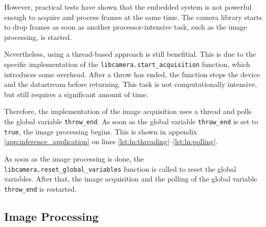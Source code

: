 However, practical tests have shown that the embedded system is not powerful enough to acquire and process frames at the same time.
The camera library starts to drop frames as soon as another processor-intensive task, such as the image processing, is started.

Nevertheless, using a thread-based approach is still benefitial.
This is due to the specific implementation of the \texttt{libcamera.start\_acquisition} function, which introduces some overhead.
After a throw has ended, the function stops the device and the datastream before returning.
This task is not computationally intensive, but still requires a significant amount of time.

Therefore, the implementation of the image acquisition uses a thread and polls the global variable \texttt{throw\_end}.
As soon as the global variable \texttt{throw\_end} is set to \texttt{true}, the image processing begins.
This is shown in appendix \ref{app:inference_application} on lines \ref{lst:ln:threading}--\ref{lst:ln:polling}.

As soon as the image processing is done, the \texttt{libcamera.reset\_global\_variables} function is called to reset the global variables.
After that, the image acquisition and the polling of the global variable \texttt{throw\_end} is restarted.


\subsection{Image Processing}
\label{subsec:inference:app:image_processing}

